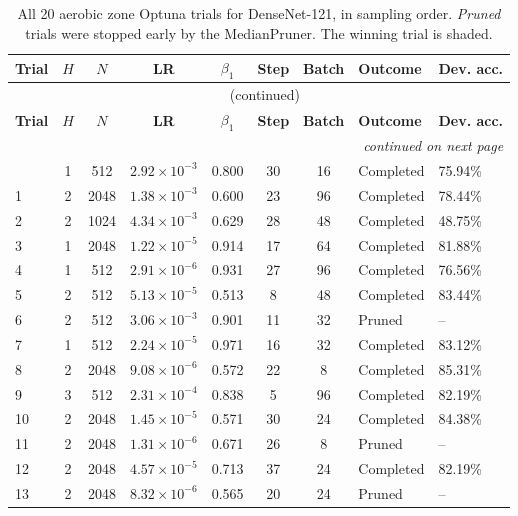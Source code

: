 {\footnotesize
\begin{longtable}{lccccccll}
\caption{All 20 aerobic zone Optuna trials for DenseNet-121, in sampling order. \emph{Pruned} trials were stopped early by the MedianPruner. The winning trial is shaded.}
\label{tab:trials_aerobic_densenet121} \\
\toprule
\textbf{Trial} & \textbf{$H$} & \textbf{$N$} & \textbf{LR} & \textbf{$\beta_1$} & \textbf{Step} & \textbf{Batch} & \textbf{Outcome} & \textbf{Dev. acc.} \\
\midrule
\endfirsthead
\multicolumn{9}{c}{\tablename\ \thetable{} (continued)} \\
\toprule
\textbf{Trial} & \textbf{$H$} & \textbf{$N$} & \textbf{LR} & \textbf{$\beta_1$} & \textbf{Step} & \textbf{Batch} & \textbf{Outcome} & \textbf{Dev. acc.} \\
\midrule
\endhead
\midrule
\multicolumn{9}{r}{\emph{continued on next page}} \\
\endfoot
\bottomrule
\endlastfoot
0 & 1 & 512 & $2.92\times10^{-3}$ & 0.800 & 30 & 16 & Completed & 75.94\% \\
1 & 2 & 2048 & $1.38\times10^{-3}$ & 0.600 & 23 & 96 & Completed & 78.44\% \\
2 & 2 & 1024 & $4.34\times10^{-3}$ & 0.629 & 28 & 48 & Completed & 48.75\% \\
3 & 1 & 2048 & $1.22\times10^{-5}$ & 0.914 & 17 & 64 & Completed & 81.88\% \\
4 & 1 & 512 & $2.91\times10^{-6}$ & 0.931 & 27 & 96 & Completed & 76.56\% \\
5 & 2 & 512 & $5.13\times10^{-5}$ & 0.513 & 8 & 48 & Completed & 83.44\% \\
6 & 2 & 512 & $3.06\times10^{-3}$ & 0.901 & 11 & 32 & Pruned & -- \\
7 & 1 & 512 & $2.24\times10^{-5}$ & 0.971 & 16 & 32 & Completed & 83.12\% \\
8 & 2 & 2048 & $9.08\times10^{-6}$ & 0.572 & 22 & 8 & Completed & 85.31\% \\
9 & 3 & 512 & $2.31\times10^{-4}$ & 0.838 & 5 & 96 & Completed & 82.19\% \\
10 & 2 & 2048 & $1.45\times10^{-5}$ & 0.571 & 30 & 24 & Completed & 84.38\% \\
11 & 2 & 2048 & $1.31\times10^{-6}$ & 0.671 & 26 & 8 & Pruned & -- \\
12 & 2 & 2048 & $4.57\times10^{-5}$ & 0.713 & 37 & 24 & Completed & 82.19\% \\
13 & 2 & 2048 & $8.32\times10^{-6}$ & 0.565 & 20 & 24 & Pruned & -- \\

\end{longtable}}
